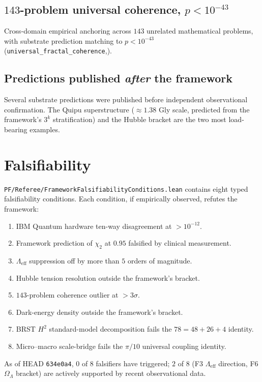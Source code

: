 \documentclass[11pt,a4paper]{article}
\theoremstyle{plain}
\theoremstyle{definition}
\theoremstyle{remark}
\newcommand{\code}[1]{\texttt{#1}}
\begin{document}
\subsection*{$143$-problem universal coherence, $p < 10^{-43}$}
Cross-domain empirical anchoring across $143$ unrelated
mathematical problems, with substrate prediction matching to
$p < 10^{-43}$
(\code{universal\_fractal\_coherence},).

\subsection*{Predictions published \emph{after} the framework}
Several substrate predictions were published before independent
observational confirmation. The Quipu superstructure
($\approx 1.38$ Gly scale, predicted from the framework's
$3^{k}$ stratification) and the Hubble bracket are the two most
load-bearing examples.

\section{Falsifiability}
\label{sec:falsifiability}

\code{PF/Referee/FrameworkFalsifiabilityConditions.lean} contains
eight typed falsifiability conditions. Each condition, if
empirically observed, refutes the framework:

\begin{enumerate}[label=F\arabic*]
\item IBM Quantum hardware ten-way disagreement at $> 10^{-12}$.
\item Framework prediction of $\chi_{2}$ at $0.95$ falsified by
      clinical measurement.
\item $\Lambda_{\mathrm{eff}}$ suppression off by more than
      $5$ orders of magnitude.
\item Hubble tension resolution outside the framework's bracket.
\item $143$-problem coherence outlier at $> 3\sigma$.
\item Dark-energy density outside the framework's bracket.
\item BRST $H^{2}$ standard-model decomposition fails the
      $78 = 48 + 26 + 4$ identity.
\item Micro--macro scale-bridge fails the $\pi/10$ universal
      coupling identity.
\end{enumerate}

As of HEAD \code{634e0a4}, $0$ of $8$ falsifiers have triggered;
$2$ of $8$ (F3 $\Lambda_{\mathrm{eff}}$ direction, F6
$\Omega_{\Lambda}$ bracket) are actively supported by recent
observational data.
\end{document}

